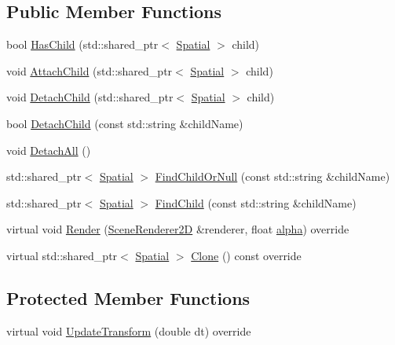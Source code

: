 \subsection*{Public Member Functions}
\begin{DoxyCompactItemize}
\item 
bool \hyperlink{classastu_1_1suite2d_1_1Node_aed39b6e4e99794a8d50d66338f34fb0f}{Has\+Child} (std\+::shared\+\_\+ptr$<$ \hyperlink{classastu_1_1suite2d_1_1Spatial}{Spatial} $>$ child)
\item 
void \hyperlink{classastu_1_1suite2d_1_1Node_af777d19c7573db16c4d70c7dcb198292}{Attach\+Child} (std\+::shared\+\_\+ptr$<$ \hyperlink{classastu_1_1suite2d_1_1Spatial}{Spatial} $>$ child)
\item 
void \hyperlink{classastu_1_1suite2d_1_1Node_ae6977abb31222cdba974bd683164cc0b}{Detach\+Child} (std\+::shared\+\_\+ptr$<$ \hyperlink{classastu_1_1suite2d_1_1Spatial}{Spatial} $>$ child)
\item 
bool \hyperlink{classastu_1_1suite2d_1_1Node_a72d49c18000140f747dbc22b8972084b}{Detach\+Child} (const std\+::string \&child\+Name)
\item 
void \hyperlink{classastu_1_1suite2d_1_1Node_ade5f4ec860f962e34baaf79e50a01a66}{Detach\+All} ()
\item 
std\+::shared\+\_\+ptr$<$ \hyperlink{classastu_1_1suite2d_1_1Spatial}{Spatial} $>$ \hyperlink{classastu_1_1suite2d_1_1Node_a91a2cf94366c6477e7a16aba676155c3}{Find\+Child\+Or\+Null} (const std\+::string \&child\+Name)
\item 
std\+::shared\+\_\+ptr$<$ \hyperlink{classastu_1_1suite2d_1_1Spatial}{Spatial} $>$ \hyperlink{classastu_1_1suite2d_1_1Node_aab94cc89c131207f17a3d36295340780}{Find\+Child} (const std\+::string \&child\+Name)
\item 
virtual void \hyperlink{classastu_1_1suite2d_1_1Node_a01bac6ed4eab4a6c77e1dac7d30d09e6}{Render} (\hyperlink{classastu_1_1suite2d_1_1SceneRenderer2D}{Scene\+Renderer2D} \&renderer, float \hyperlink{classastu_1_1suite2d_1_1Spatial_a8aedfdadbece638bf283d4ba232c6928}{alpha}) override
\item 
virtual std\+::shared\+\_\+ptr$<$ \hyperlink{classastu_1_1suite2d_1_1Spatial}{Spatial} $>$ \hyperlink{classastu_1_1suite2d_1_1Node_a50803fe4a2182ca7320cd2f161873c51}{Clone} () const override
\end{DoxyCompactItemize}
\subsection*{Protected Member Functions}
\begin{DoxyCompactItemize}
\item 
virtual void \hyperlink{classastu_1_1suite2d_1_1Node_af3fbe9c9588b3f20a1d58645fd2371e0}{Update\+Transform} (double dt) override
\end{DoxyCompactItemize}
